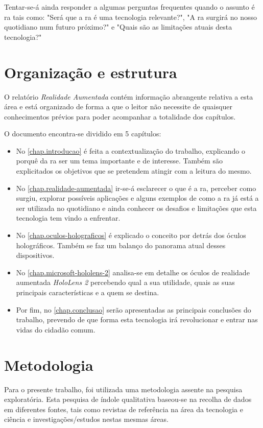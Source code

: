 \documentclass{report}
\begin{document}
Tentar-se-á ainda responder a algumas perguntas frequentes quando o assunto é \ac{ra} tais como: "Será que a \ac{ra} é uma tecnologia relevante?", "A \ac{ra} surgirá no nosso quotidiano num futuro próximo?" e "Quais são as limitações atuais desta tecnologia?"

\section{Organização e estrutura}
O relatório \textit{Realidade Aumentada} contém informação abrangente relativa a esta área e está organizado de forma a que o leitor não necessite de quaisquer conhecimentos prévios para poder acompanhar a totalidade dos capítulos.

O documento encontra-se dividido em 5 capítulos:
\begin{itemize}
    \item No \autoref{chap.introducao} é feita a contextualização do trabalho, explicando o porquê da \ac{ra} ser um tema importante e de interesse. Também são explicitados os objetivos que se pretendem atingir com a leitura do mesmo.
    \item No \autoref{chap.realidade-aumentada} ir-se-á esclarecer o que é a \ac{ra}, perceber como surgiu, explorar possíveis aplicações e alguns exemplos de como a \ac{ra} já está a ser utilizada no quotidiano e ainda conhecer os desafios e limitações que esta tecnologia tem vindo a enfrentar.
    \item No \autoref{chap.oculos-holograficos} é explicado o conceito por detrás dos óculos holográficos. Também se faz um balanço do panorama atual desses dispositivos.
    \item No \autoref{chap.microsoft-hololens-2} analisa-se em detalhe os óculos de realidade aumentada \textit{HoloLens 2} percebendo qual a sua utilidade, quais as suas principais características e a quem se destina.
    \item Por fim, no \autoref{chap.conclusao} serão apresentadas as principais conclusões do trabalho, prevendo de que forma esta tecnologia irá revolucionar e entrar nas vidas do cidadão comum.
\end{itemize}

\section{Metodologia}
Para o presente trabalho, foi utilizada uma metodologia assente na pesquisa exploratória. Esta pesquisa de índole qualitativa baseou-se na recolha de dados em diferentes fontes, tais como revistas de referência na área da tecnologia e ciência e investigações/estudos nestas mesmas áreas.
\end{document}
